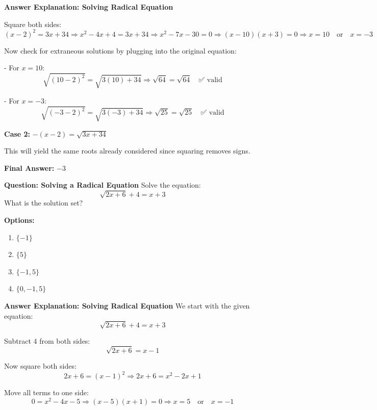\documentclass{beamer}
\begin{document}
\begin{frame}{\textbf{Answer Explanation: Solving Radical Equation}}


Square both sides:
\[
(x - 2)^2 = 3x + 34
\Rightarrow x^2 - 4x + 4 = 3x + 34
\Rightarrow x^2 - 7x - 30 = 0
\Rightarrow (x - 10)(x + 3) = 0
\Rightarrow x = 10 \quad \text{or} \quad x = -3
\]

Now check for extraneous solutions by plugging into the original equation:

- For \(x = 10\):
\[
\sqrt{(10 - 2)^2} = \sqrt{3(10) + 34}
\Rightarrow \sqrt{64} = \sqrt{64} \quad \text{✅ valid}
\]

- For \(x = -3\):
\[
\sqrt{(-3 - 2)^2} = \sqrt{3(-3) + 34}
\Rightarrow \sqrt{25} = \sqrt{25} \quad \text{✅ valid}
\]

\textbf{Case 2:} \(-(x - 2) = \sqrt{3x + 34}\)

This will yield the same roots already considered since squaring removes signs.

\vspace{0.3cm}
\textbf{Final Answer:} \(\boxed{-3}\)
\end{frame}


\begin{frame}{\textbf{Question: Solving a Radical Equation}}
Solve the equation:
\[
\sqrt{2x + 6} + 4 = x + 3
\]
What is the solution set?

\textbf{Options:}
\begin{enumerate}
    \item[A.] \(\{-1\}\)
    \item[B.] \(\{5\}\)
    \item[C.] \(\{-1, 5\}\)
    \item[D.] \(\{0, -1, 5\}\)
\end{enumerate}
\end{frame}

\begin{frame}{\textbf{Answer Explanation: Solving Radical Equation}}
We start with the given equation:
\[
\sqrt{2x + 6} + 4 = x + 3
\]

Subtract 4 from both sides:
\[
\sqrt{2x + 6} = x - 1
\]

Now square both sides:
\[
2x + 6 = (x - 1)^2
\Rightarrow 2x + 6 = x^2 - 2x + 1
\]

Move all terms to one side:
\[
0 = x^2 - 4x - 5
\Rightarrow (x - 5)(x + 1) = 0
\Rightarrow x = 5 \quad \text{or} \quad x = -1
\]


\end{frame}
\end{document}
